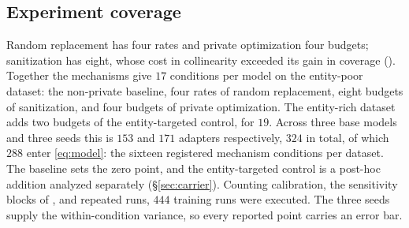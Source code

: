 \subsection{Experiment coverage}
Random replacement has four rates and private optimization four budgets;
sanitization has eight,
whose cost in collinearity exceeded its gain in coverage ().
Together the mechanisms give $17$ conditions per model on the entity-poor dataset:
the non-private baseline,
four rates of random replacement,
eight budgets of sanitization,
and four budgets of private optimization.
The entity-rich dataset adds two budgets of the entity-targeted control,
for $19$.
Across three base models and three seeds this is $153$ and $171$ adapters respectively,
$324$ in total,
of which $288$ enter \eqref{eq:model}:
the sixteen registered mechanism conditions per dataset.
The baseline sets the zero point,
and the entity-targeted control is a post-hoc addition analyzed separately (\S\ref{sec:carrier}).
Counting calibration,
the sensitivity blocks of ,
and repeated runs,
$444$ training runs were executed.
The three seeds supply the within-condition variance,
so every reported point carries an error bar.
